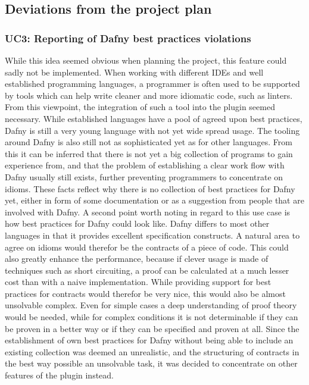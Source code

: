 \subsection{Deviations from the project plan}

\subsubsection{UC3: Reporting of Dafny best practices violations}
While this idea seemed obvious when planning the project, this feature could sadly not be implemented. When working with different IDEs and well established programming languages, a programmer is often used to be supported by tools which can help write cleaner and more idiomatic code, such as linters. From this viewpoint, the integration of such a tool into the plugin seemed necessary. \newline
While established languages have a pool of agreed upon best practices, Dafny is still a very young language with not yet wide spread usage. The tooling around Dafny is also still not as sophisticated yet as for other languages. From this it can be inferred that there is not yet a big collection of programs to gain experience from, and that the problem of establishing a clear work flow with Dafny usually still exists, further preventing programmers to concentrate on idioms. \newline
These facts reflect why there is no collection of best practices for Dafny yet, either in form of some documentation or as a suggestion from people that are involved with Dafny. \newline
A second point worth noting in regard to this use case is how best practices for Dafny could look like. Dafny differs to most other languages in that it provides excellent specification constructs. A natural area to agree on idioms would therefor be the contracts of a piece of code. This could also greatly enhance the performance, because if clever usage is made of techniques such as short circuiting, a proof can be calculated at a much lesser cost than with a naive implementation. \newline
While providing support for best practices for contracts would therefor be very nice, this would also be almost unsolvable complex. Even for simple cases a deep understanding of proof theory would be needed, while for complex conditions it is not determinable if they can be proven in a better way or if they can be specified and proven at all. \newline
Since the establishment of own best practices for Dafny without being able to include an existing collection was deemed an unrealistic, and the structuring of contracts in the best way possible an unsolvable task, it was decided to concentrate on other features of the plugin instead. \newline


